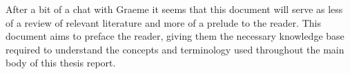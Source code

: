 After a bit of a chat with Graeme it seems that this document will serve as less of a review of relevant literature and more of a prelude to the reader. This document aims to preface the reader, giving them the necessary knowledge base required to understand the concepts and terminology used throughout the main body of this thesis report. 